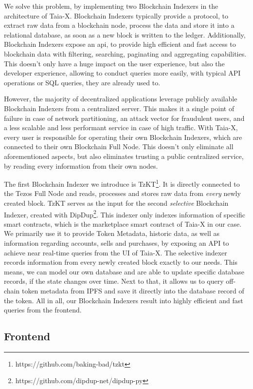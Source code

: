 We solve this problem, by implementing two Blockchain Indexers in the architecture of Taia-X. Blockchain Indexers typically provide a protocol, to extract raw data from a blockchain node, process the data and store it into a relational database, as soon as a new block is written to the ledger. Additionally, Blockchain Indexers expose an \acrshort{api}, to provide high efficient and fast access to blockchain data with filtering, searching, paginating and aggregating capabilities. This doesn't only have a huge impact on the user experience, but also the developer experience, allowing to conduct queries more easily, with typical API operations or SQL queries, they are already used to.

However, the majority of decentralized applications leverage publicly available Blockchain Indexers from a centralized server. This makes it a single point of failure in case of network partitioning, an attack vector for fraudulent users, and a less scalable and less performant service in case of high traffic. With Taia-X, every user is responsible for operating their own Blockchain Indexers, which are connected to their own Blockchain Full Node. This doesn't only eliminate all aforementioned aspects, but also eliminates trusting a public centralized service, by reading every information from their own nodes.
            
The first Blockchain Indexer we introduce is TzKT\footnote{https://github.com/baking-bad/tzkt}. It is directly connected to the Tezos Full Node and reads, processes and stores raw data from \emph{every} newly created block. TzKT serves as the input for the second \emph{selective} Blockchain Indexer, created with DipDup\footnote{https://github.com/dipdup-net/dipdup-py}. This indexer only indexes information of specific smart contracts, which is the marketplace smart contract of Taia-X in our case. We primarily use it to provide Token Metadata, historic data, as well as information regarding accounts, sells and purchases, by exposing an API to achieve near real-time queries from the UI of Taia-X. The selective indexer records information from every newly created block exactly to our needs. This means, we can model our own database and are able to update specific database records, if the state changes over time. Next to that, it allows us to query off-chain token metadata from IPFS and save it directly into the database record of the token. All in all, our Blockchain Indexers result into highly efficient and fast queries from the frontend.

\subsection{Frontend}
        
